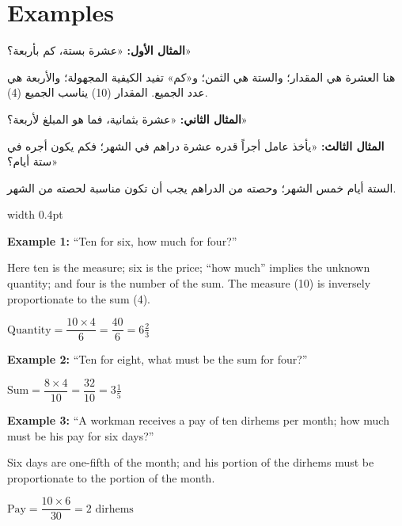 \documentclass[11pt,a4paper,openany,oneside]{book}
\begin{document}
\newpage

\section*{Examples}

\noindent\begin{minipage}[t]{0.48\textwidth}
\raggedleft

\begin{Arabic}
\textbf{المثال الأول:} «عشرة بستة، كم بأربعة؟»

هنا العشرة هي المقدار؛ والستة هي الثمن؛ و«كم» تفيد الكيفية المجهولة؛ والأربعة هي عدد الجميع. المقدار (10) يناسب الجميع (4).

\textbf{المثال الثاني:} «عشرة بثمانية، فما هو المبلغ لأربعة؟»

\textbf{المثال الثالث:} «يأخذ عامل أجراً قدره عشرة دراهم في الشهر؛ فكم يكون أجره في ستة أيام؟»

الستة أيام خمس الشهر؛ وحصته من الدراهم يجب أن تكون مناسبة لحصته من الشهر.
\end{Arabic}

\end{minipage}%
\hfill\vrule width 0.4pt\hfill
\begin{minipage}[t]{0.48\textwidth}
\raggedright

\textbf{Example 1:} ``Ten for six, how much for four?''

Here ten is the measure; six is the price; ``how much'' implies the unknown quantity; and four is the number of the sum. The measure (10) is inversely proportionate to the sum (4).

$\text{Quantity} = \dfrac{10 \times 4}{6} = \dfrac{40}{6} = 6\tfrac{2}{3}$

\vspace{0.3cm}

\textbf{Example 2:} ``Ten for eight, what must be the sum for four?''

$\text{Sum} = \dfrac{8 \times 4}{10} = \dfrac{32}{10} = 3\tfrac{1}{5}$

\vspace{0.3cm}

\textbf{Example 3:} ``A workman receives a pay of ten dirhems per month; how much must be his pay for six days?''

Six days are one-fifth of the month; and his portion of the dirhems must be proportionate to the portion of the month.

$\text{Pay} = \dfrac{10 \times 6}{30} = 2 \text{ dirhems}$

\end{minipage}
\vspace{0.3cm}
\end{document}
